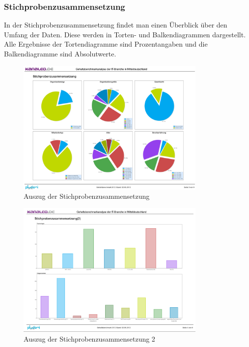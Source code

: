 \subsubsection{Stichprobenzusammensetzung}
In der Stichprobenzusammensetzung findet man einen Überblick über den Umfang der Daten. Diese werden in Torten- und Balkendiagrammen dargestellt. Alle Ergebnisse der Tortendiagramme sind Prozentangaben und die Balkendiagramme sind Absolutwerte.
\begin{figure}[htbp]
 \centering
 \includegraphics[width=350px]{./material/auszug_ueberblick_1.png}
 \caption{Auszug der Stichprobenzusammensetzung}
 \label{fig:Ueberblick_1}
\end{figure}
\begin{figure}[htbp]
 \centering
 \includegraphics[width=350px]{./material/auszug_ueberblick_2.png}
 \caption{Auszug der Stichprobenzusammensetzung 2}
 \label{fig:Ueberblick_2}
\end{figure}
